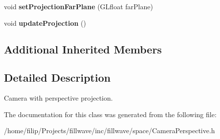 \begin{DoxyCompactItemize}
\item 
void {\bfseries set\+Projection\+Far\+Plane} (G\+Lfloat far\+Plane)\hypertarget{classflw_1_1flf_1_1CameraPerspective_aed83834404ba2025de37207ab2453850}{}\label{classflw_1_1flf_1_1CameraPerspective_aed83834404ba2025de37207ab2453850}

\item 
void {\bfseries update\+Projection} ()\hypertarget{classflw_1_1flf_1_1CameraPerspective_aca94b0f08121b76fe51d99d6685de097}{}\label{classflw_1_1flf_1_1CameraPerspective_aca94b0f08121b76fe51d99d6685de097}

\end{DoxyCompactItemize}
\subsection*{Additional Inherited Members}


\subsection{Detailed Description}
Camera with perspective projection. 

The documentation for this class was generated from the following file\+:\begin{DoxyCompactItemize}
\item 
/home/filip/\+Projects/fillwave/inc/fillwave/space/Camera\+Perspective.\+h\end{DoxyCompactItemize}

